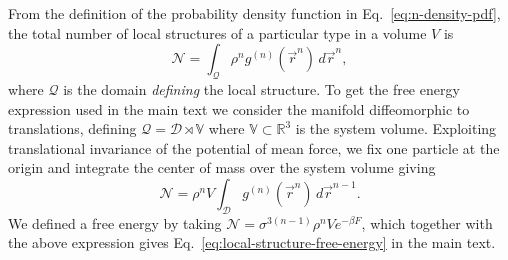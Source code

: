 \documentclass[12pt]{report}
\begin{document}
From the definition of the probability density function in Eq.\ \eqref{eq:n-density-pdf}, the total number of local structures of a particular type in a volume $V$ is
\begin{equation}\label{eq:structure-population}
  \mathcal{N} =
  \int_{\mathcal{Q}} \rho^n g^{(n)}(\vec{r}^n) \, d\vec{r}^n,
\end{equation}
where $\mathcal{Q}$ is the domain \emph{defining} the local structure.
To get the free energy expression used in the main text we consider the manifold diffeomorphic to translations, defining $\mathcal{Q} = \mathcal{D} \rtimes \mathbb{V}$ where $\mathbb{V}\subset \mathbb{R}^3$ is the system volume.
Exploiting translational invariance of the potential of mean force, we fix one particle at the origin and integrate the center of mass over the system volume giving
\begin{equation}
  \mathcal{N} =
  \rho^n V \int_{\mathcal{D}} g^{(n)}(\vec{r}^n) \, d\vec{r}^{n-1}.
\end{equation}
We defined a free energy by taking $\mathcal{N} = \sigma^{3(n-1)} \rho^n V e^{-\beta F}$, which together with the above expression gives Eq.\ \eqref{eq:local-structure-free-energy} in the main text.
\end{document}
